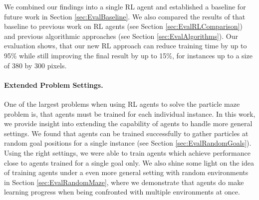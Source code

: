 We combined our findings into a single RL agent and established a baseline for future work in Section \ref{sec:EvalBaseline}. We also compared the results of that baseline to previous work on RL agents (see Section \ref{sec:EvalRLComparison}) and previous algorithmic approaches (see Section \ref{sec:EvalAlgorithms}). Our evaluation shows, that our new RL approach can reduce training time by up to 95\% while still improving the final result by up to 15\%, for instances up to a size of 380 by 300 pixels.


\paragraph{Extended Problem Settings.}
One of the largest problems when using RL agents to solve the particle maze problem is, that agents must be trained for each individual instance. In this work, we provide insight into extending the capability of agents to handle more general settings. We found that agents can be trained successfully to gather particles at random goal positions for a single instance (see Section \ref{sec:EvalRandomGoals}). Using the right settings, we were able to train agents which achieve performance close to agents trained for a single goal only. We also shine some light on the idea of training agents under a even more general setting with random environments in Section \ref{sec:EvalRandomMaze}, where we demonstrate that agents do make learning progress when being confronted with multiple environments at once. 


